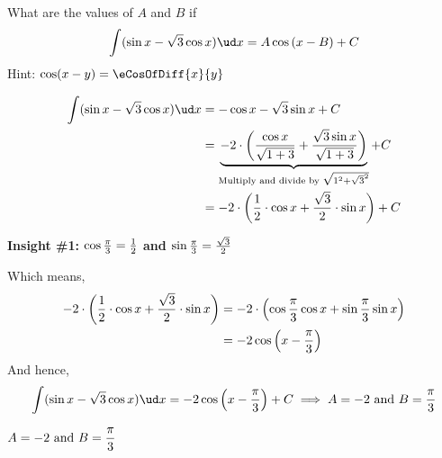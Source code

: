 



\question[4] What are the values of $A$ and $B$ if 
  \[ \int(\vc\sin x - \vd\cos x)\ud x = A\cos\left(x-B\right) + C \]
Hint: $\cos (x-y) = \eCosOfDiff{x}{y}$

\watchout

\begin{solution}[\halfpage]
  \begin{align}
    \int (\vc\sin x - \vd\cos x) \ud x &= -\vc\cos x - \vd\sin x + C \\
    &= \underbrace{-2\cdot\left( \dfrac{\vc\cos x}{\sqrt{\va + \vb}} + \dfrac{\vd\sin x}{\sqrt{\va + \vb}} \right)}
    _{\text{Multiply and divide by }\sqrt{1^2+\sqrt{3}^2}}+ C  \\
    &= -2\cdot\left(\dfrac\vx{2}\cdot\cos x + \dfrac\vy{2}\cdot\sin x \right) + C 
  \end{align}

  \textbf{Insight \#1: $\cos\frac\pi{3}=\frac{1}{2}$ and $\sin\frac\pi{3}=\frac{\sqrt{3}}{2}$}

  Which means, 
  \begin{align}
    -2\cdot\left(\dfrac{1}{2}\cdot\cos x + \dfrac{\sqrt{3}}{2}\cdot\sin x \right) &= 
    -2\cdot\left( \cos\frac\pi{3}\cos x + \sin\frac\pi{3}\sin x \right) \\
    &= -2\cos\left( x - \frac\pi{3} \right) 
  \end{align}
  And hence, 
  \[ \int (\vc\sin x - \vd\cos x) \ud x = -2\cos\left( x - \frac\pi\vz \right) + C \implies A = -2\text{ and } B = \dfrac\pi\vz \]
\end{solution}

\ifprintanswers\begin{codex}$A=-2\text{ and } B = \dfrac\pi{3}$\end{codex}\fi
